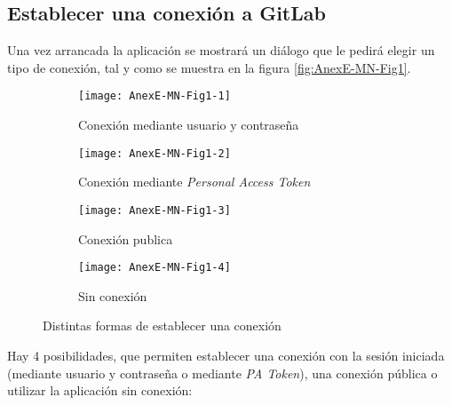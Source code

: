 \subsection{Establecer una conexión a GitLab}
Una vez arrancada la aplicación se mostrará un diálogo que le pedirá elegir un tipo de conexión, tal y como se muestra en la figura \ref{fig:AnexE-MN-Fig1}.
\begin{figure}[!h]
	\centering
	\begin{subfigure}{.45\textwidth}
		\centering
		\texttt{[image: AnexE-MN-Fig1-1]}
		\caption{Conexión mediante usuario y contraseña}
		\label{fig:dialogo-conexion_contraseña}
	\end{subfigure}\hfill
	\begin{subfigure}{.45\textwidth}
		\centering
		\texttt{[image: AnexE-MN-Fig1-2]}
		\caption{Conexión mediante \textit{Personal Access Token}}
		\label{fig:dialogo-conexion_token}
	\end{subfigure}
	\begin{subfigure}{.45\textwidth}
		\centering
		\texttt{[image: AnexE-MN-Fig1-3]}
		\caption{Conexión publica}
		\label{fig:dialogo-conexion_publica}
	\end{subfigure}\hfill
	\begin{subfigure}{.45\textwidth}
		\centering
		\texttt{[image: AnexE-MN-Fig1-4]}
		\caption{Sin conexión}
		\label{fig:dialogo-conexion_sin-conexion}
	\end{subfigure}
	\caption{Distintas formas de establecer una conexión}
	\label{fig:AnexE-MN-Fig1-}
\end{figure}
Hay 4 posibilidades, que permiten establecer una conexión con la sesión iniciada (mediante usuario y contraseña o mediante \textit{PA Token}), una conexión pública o utilizar la aplicación sin conexión:
